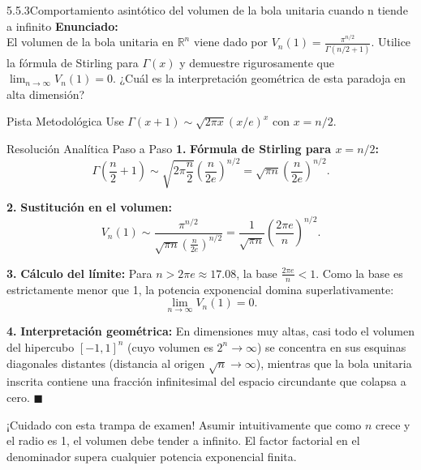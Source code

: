 \documentclass[11pt,a4paper]{article}
\begin{document}
\begin{nivelbox}{5.5.3}{Comportamiento asintótico del volumen de la bola unitaria cuando n tiende a infinito}
\textbf{Enunciado:}\\
El volumen de la bola unitaria en $\mathbb{R}^n$ viene dado por $V_n(1) = \frac{\pi^{n/2}}{\Gamma(n/2 + 1)}$. Utilice la fórmula de Stirling para $\Gamma(x)$ y demuestre rigurosamente que $\lim_{n \to \infty} V_n(1) = 0$. ¿Cuál es la interpretación geométrica de esta paradoja en alta dimensión?

\begin{observacionbox}{Pista Metodológica}
Use $\Gamma(x+1) \sim \sqrt{2\pi x} (x/e)^x$ con $x = n/2$.
\end{observacionbox}

\begin{ejerciciobox}{Resolución Analítica Paso a Paso}
\smallskip\noindent\textbf{1.} \textbf{Fórmula de Stirling para $x = n/2$:}
\[\Gamma\left(\frac{n}{2} + 1\right) \sim \sqrt{2\pi \frac{n}{2}} \left( \frac{n}{2e} \right)^{n/2} = \sqrt{\pi n} \left( \frac{n}{2e} \right)^{n/2}.\]

\smallskip\noindent\textbf{2.} \textbf{Sustitución en el volumen:}
\[V_n(1) \sim \frac{\pi^{n/2}}{\sqrt{\pi n} \left( \frac{n}{2e} \right)^{n/2}} = \frac{1}{\sqrt{\pi n}} \left( \frac{2\pi e}{n} \right)^{n/2}.\]

\smallskip\noindent\textbf{3.} \textbf{Cálculo del límite:}
Para $n > 2\pi e \approx 17.08$, la base $\frac{2\pi e}{n} < 1$.
Como la base es estrictamente menor que 1, la potencia exponencial domina superlativamente:
\[\lim_{n \to \infty} V_n(1) = 0.\]

\smallskip\noindent\textbf{4.} \textbf{Interpretación geométrica:}
En dimensiones muy altas, casi todo el volumen del hipercubo $[-1, 1]^n$ (cuyo volumen es $2^n \to \infty$) se concentra en sus esquinas diagonales distantes (distancia al origen $\sqrt{n} \to \infty$), mientras que la bola unitaria inscrita contiene una fracción infinitesimal del espacio circundante que colapsa a cero. $\blacksquare$
\end{ejerciciobox}

\begin{errorbox}{¡Cuidado con esta trampa de examen!}
Asumir intuitivamente que como $n$ crece y el radio es 1, el volumen debe tender a infinito. El factor factorial en el denominador supera cualquier potencia exponencial finita.
\end{errorbox}
\end{nivelbox}
\bigskip
\end{document}
